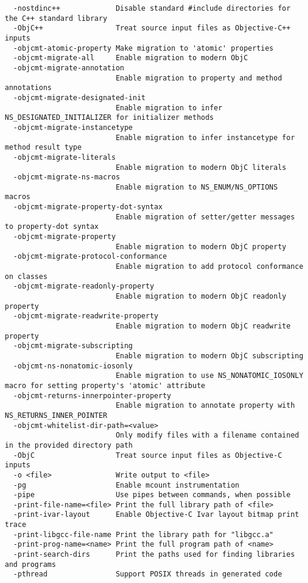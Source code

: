 \begin{verbatim}
  -nostdinc++             Disable standard #include directories for the C++ standard library
  -ObjC++                 Treat source input files as Objective-C++ inputs
  -objcmt-atomic-property Make migration to 'atomic' properties
  -objcmt-migrate-all     Enable migration to modern ObjC
  -objcmt-migrate-annotation
                          Enable migration to property and method annotations
  -objcmt-migrate-designated-init
                          Enable migration to infer NS_DESIGNATED_INITIALIZER for initializer methods
  -objcmt-migrate-instancetype
                          Enable migration to infer instancetype for method result type
  -objcmt-migrate-literals
                          Enable migration to modern ObjC literals
  -objcmt-migrate-ns-macros
                          Enable migration to NS_ENUM/NS_OPTIONS macros
  -objcmt-migrate-property-dot-syntax
                          Enable migration of setter/getter messages to property-dot syntax
  -objcmt-migrate-property
                          Enable migration to modern ObjC property
  -objcmt-migrate-protocol-conformance
                          Enable migration to add protocol conformance on classes
  -objcmt-migrate-readonly-property
                          Enable migration to modern ObjC readonly property
  -objcmt-migrate-readwrite-property
                          Enable migration to modern ObjC readwrite property
  -objcmt-migrate-subscripting
                          Enable migration to modern ObjC subscripting
  -objcmt-ns-nonatomic-iosonly
                          Enable migration to use NS_NONATOMIC_IOSONLY macro for setting property's 'atomic' attribute
  -objcmt-returns-innerpointer-property
                          Enable migration to annotate property with NS_RETURNS_INNER_POINTER
  -objcmt-whitelist-dir-path=<value>
                          Only modify files with a filename contained in the provided directory path
  -ObjC                   Treat source input files as Objective-C inputs
  -o <file>               Write output to <file>
  -pg                     Enable mcount instrumentation
  -pipe                   Use pipes between commands, when possible
  -print-file-name=<file> Print the full library path of <file>
  -print-ivar-layout      Enable Objective-C Ivar layout bitmap print trace
  -print-libgcc-file-name Print the library path for "libgcc.a"
  -print-prog-name=<name> Print the full program path of <name>
  -print-search-dirs      Print the paths used for finding libraries and programs
  -pthread                Support POSIX threads in generated code

\end{verbatim}
